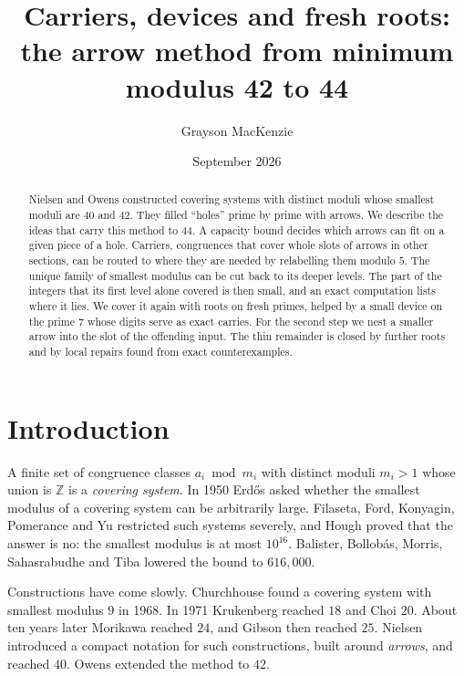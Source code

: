\documentclass[11pt]{amsart}
\title[Carriers, devices and fresh roots]{Carriers, devices and fresh roots:\\ the arrow method from minimum modulus 42 to 44}
\author{Grayson MacKenzie}
\date{September 2026}
\theoremstyle{definition}
\theoremstyle{remark}
\newcommand{\Z}{\mathbb{Z}}
\begin{document}
\begin{abstract}
Nielsen and Owens constructed covering systems with distinct moduli whose smallest moduli are $40$ and $42$. They
filled ``holes'' prime by prime with arrows. We describe the ideas that carry this method to $44$. A capacity bound
decides which arrows can fit on a given piece of a hole. Carriers, congruences that cover whole slots of arrows in
other sections, can be routed to where they are needed by relabelling them modulo $5$. The unique family of smallest
modulus can be cut back to its deeper levels. The part of the integers that its first level alone covered is then
small, and an exact computation lists where it lies. We cover it again with roots on fresh primes, helped by a small
device on the prime $7$ whose digits serve as exact carries. For the second step we nest a smaller arrow into the slot
of the offending input. The thin remainder is closed by further roots and by local repairs found from exact
counterexamples.
\end{abstract}

\maketitle

\section{Introduction}

A finite set of congruence classes $a_i \bmod m_i$ with distinct moduli $m_i>1$ whose union is $\Z$ is a
\emph{covering system}. In 1950 Erdős \cite{Erdos50} asked whether the smallest modulus of a covering system can be
arbitrarily large. Filaseta, Ford, Konyagin, Pomerance and Yu \cite{FFKPY07} restricted such systems severely, and
Hough \cite{Hough15} proved that the answer is no: the smallest modulus is at most $10^{16}$. Balister, Bollobás,
Morris, Sahasrabudhe and Tiba \cite{BBMST22} lowered the bound to $616{,}000$.

Constructions have come slowly. Churchhouse \cite{Churchhouse68} found a covering system with smallest modulus $9$ in
1968. In 1971 Krukenberg \cite{Krukenberg71} reached $18$ and Choi \cite{Choi71} $20$. About ten years later Morikawa
\cite{Morikawa81a,Morikawa81b} reached $24$, and Gibson \cite{Gibson09} then reached $25$. Nielsen \cite{Nielsen09}
introduced a compact notation for such constructions, built around \emph{arrows}, and reached $40$. Owens
\cite{Owens14} extended the method to $42$.
\end{document}

